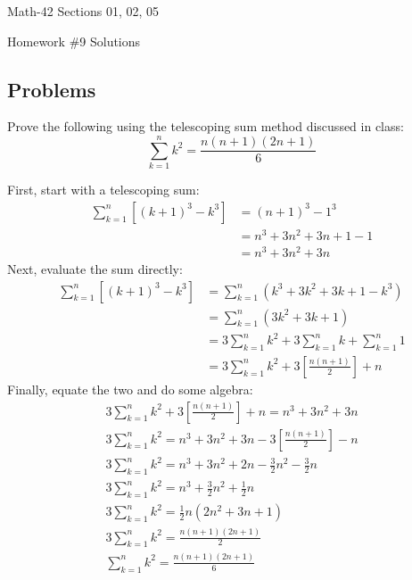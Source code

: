 \documentclass[letterpaper,12pt,fleqn]{article}
\newcommand{\son}{\sum_{k=1}^n}
\begin{document}
\begin{center}
  \large
  Math-42 Sections 01, 02, 05

  \Large
  Homework \#9 Solutions
\end{center}

\subsection*{Problems}

Prove the following using the telescoping sum method discussed in class:
\[\sum_{k=1}^nk^2=\frac{n(n+1)(2n+1)}{6}\]

\bigskip

First, start with a telescoping sum:
\begin{align*}
  \son [(k+1)^3-k^3] &= (n+1)^3-1^3 \\
  &= n^3+3n^2+3n+1-1 \\
  &= n^3+3n^2+3n
\end{align*}
Next, evaluate the sum directly:
\begin{align*}
  \son [(k+1)^3-k^3] &= \son(k^3+3k^2+3k+1-k^3) \\
  &= \son(3k^2+3k+1) \\
  &= 3\son k^2+3\son k+\son 1 \\
  &= 3\son k^2+3\left[\frac{n(n+1)}{2}\right]+n
\end{align*}
Finally, equate the two and do some algebra:
\begin{gather*}
  3\son k^2+3\left[\frac{n(n+1)}{2}\right]+n=n^3+3n^2+3n \\
  3\son k^2=n^3+3n^2+3n-3\left[\frac{n(n+1)}{2}\right]-n \\
  3\son k^2=n^3+3n^2+2n-\frac{3}{2}n^2-\frac{3}{2}n \\
  3\son k^2=n^3+\frac{3}{2}n^2+\frac{1}{2}n \\
  3\son k^2=\frac{1}{2}n(2n^2+3n+1) \\
  3\son k^2=\frac{n(n+1)(2n+1)}{2} \\
  \son k^2=\frac{n(n+1)(2n+1)}{6}
\end{gather*}
\end{document}
